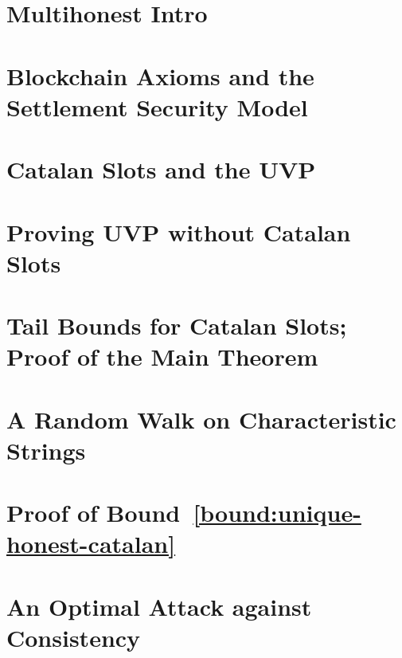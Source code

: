 \chapter{Multihonest Intro}\label{ch:intro-multihonest}


\chapter{Blockchain Axioms and the Settlement Security Model}\label{sec:model-multihonest}


\chapter{Catalan Slots and the UVP}\label{sec:catalan}\label{sec:definitions-multihonest}





\chapter{Proving UVP without Catalan Slots}\label{sec:fork-framework}



\chapter{Tail Bounds for Catalan Slots; Proof of the Main Theorem}\label{sec:bounds-main-proofs-multihonest}


\chapter{A Random Walk on Characteristic Strings}\label{sec:rand-walks}
 


\chapter[Proving the Tail Bound]{Proof of \texorpdfstring{Bound~\ref{bound:unique-honest-catalan}}{the First Tail Bound} }\label{sec:estimates-multihonest}



\chapter{An Optimal Attack against Consistency}\label{sec:opt-adversary}



